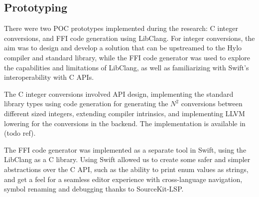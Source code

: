 \subsection{Prototyping}
There were two POC prototypes implemented during the research: C integer conversions, and FFI code generation using LibClang. For integer conversions, the aim was to design and develop a solution that can be upstreamed to the Hylo compiler and standard library, while the FFI code generator was used to explore the capabilities and limitations of LibClang, as well as familiarizing with Swift's interoperability with C APIs.

The C integer conversions involved API design, implementing the standard library types using code generation for generating the $N^2$ conversions between different sized integers, extending compiler intrinsics, and implementing LLVM lowering for the conversions in the backend. The implementation is available in (todo ref).

The FFI code generator was implemented as a separate tool in Swift, using the LibClang as a C library. Using Swift allowed us to create some safer and simpler abstractions over the C API, such as the ability to print enum values as strings, and get a feel for a seamless editor experience with cross-language navigation, symbol renaming and debugging thanks to SourceKit-LSP.
